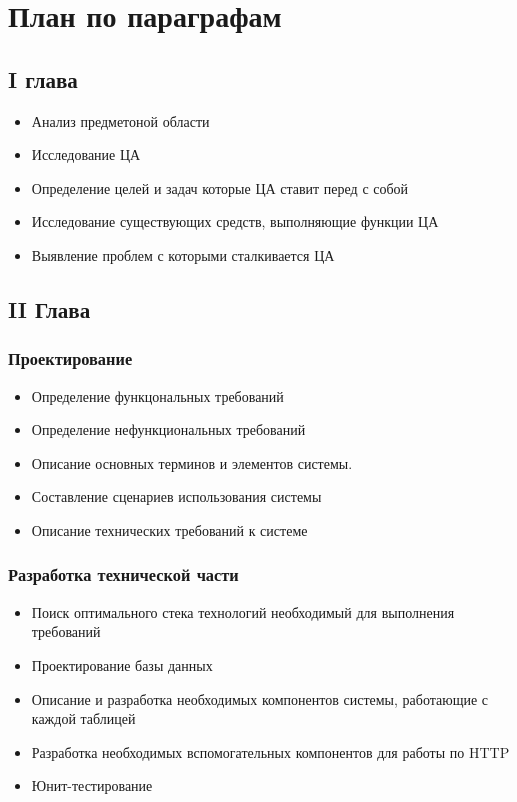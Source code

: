 \documentclass[14pt, timesnewroman]{article}
\begin{document}
\section{План по параграфам}

\subsection{I глава}
\begin{itemize}
    \item Анализ предметоной области
    \item Исследование ЦА
    \item Определение целей и задач которые ЦА ставит перед с собой
    \item Исследование существующих средств, выполняющие функции ЦА
    \item Выявление проблем с которыми сталкивается ЦА
\end{itemize}
\subsection{II Глава}
\subsubsection{Проектирование}
\begin{itemize}
    \item Определение функцональных требований
    \item Определение нефункциональных требований
    \item Описание основных терминов и элементов системы.
    \item Составление сценариев использования системы
    \item Описание технических требований к системе
\end{itemize}
\subsubsection{Разработка технической части}
\begin{itemize}
    \item Поиск оптимального стека технологий необходимый для выполнения требований
    \item Проектирование базы данных
    \item Описание и разработка необходимых компонентов системы, работающие с каждой таблицей
    \item Разработка необходимых вспомогательных компонентов для работы по HTTP
    \item Юнит-тестирование
\end{itemize}
\end{document}
